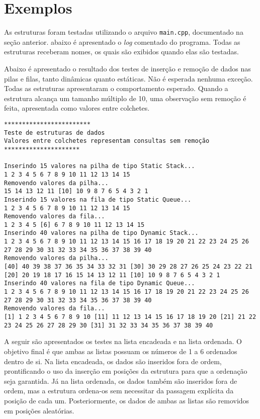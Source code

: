 
\chapter{Exemplos}

As estruturas foram testadas utilizando o arquivo \texttt{main.cpp}, documentado na seção anterior. abaixo é apresentado o \emph{log} comentado do programa. Todas as estruturas receberam nomes, os quais são exibidos quando elas são testadas.

Abaixo é apresentado o resultado dos testes de inserção e remoção de dados nas pilas e filas, tanto dinâmicas quanto estáticas. Não é esperada nenhuma exceção. Todas as estruturas apresentaram o comportamento esperado. Quando a estrutura alcança um tamanho múltiplo de 10, uma observação sem remoção é feita, apresentada como valores entre colchetes.

\begin{verbatim}
************************
Teste de estruturas de dados
Valores entre colchetes representam consultas sem remoção
*********************

Inserindo 15 valores na pilha de tipo Static Stack...
1 2 3 4 5 6 7 8 9 10 11 12 13 14 15
Removendo valores da pilha...
15 14 13 12 11 [10] 10 9 8 7 6 5 4 3 2 1
Inserindo 15 valores na fila de tipo Static Queue...
1 2 3 4 5 6 7 8 9 10 11 12 13 14 15
Removendo valores da fila...
1 2 3 4 5 [6] 6 7 8 9 10 11 12 13 14 15
Inserindo 40 valores na pilha de tipo Dynamic Stack...
1 2 3 4 5 6 7 8 9 10 11 12 13 14 15 16 17 18 19 20 21 22 23 24 25 26 27 28 29 30 31 32 33 34 35 36 37 38 39 40
Removendo valores da pilha...
[40] 40 39 38 37 36 35 34 33 32 31 [30] 30 29 28 27 26 25 24 23 22 21 [20] 20 19 18 17 16 15 14 13 12 11 [10] 10 9 8 7 6 5 4 3 2 1
Inserindo 40 valores na fila de tipo Dynamic Queue...
1 2 3 4 5 6 7 8 9 10 11 12 13 14 15 16 17 18 19 20 21 22 23 24 25 26 27 28 29 30 31 32 33 34 35 36 37 38 39 40
Removendo valores da fila...
[1] 1 2 3 4 5 6 7 8 9 10 [11] 11 12 13 14 15 16 17 18 19 20 [21] 21 22 23 24 25 26 27 28 29 30 [31] 31 32 33 34 35 36 37 38 39 40
\end{verbatim}

A seguir são apresentados os testes na lista encadeada e na lista ordenada. O objetivo final é que ambas as listas possuam os números de 1 a 6 ordenados dentro de si. Na lista encadeada, os dados são inseridos fora de ordem, prontificando o uso da inserção em posições da estrutura para que a ordenação seja garantida. Já na lista ordenada, os dados também são inseridos fora de ordem, mas a estrutura ordena-os sem necessitar da passagem explícita da posição de cada um. Posteriormente, os dados de ambas as listas são removidos em posições aleatórias.

